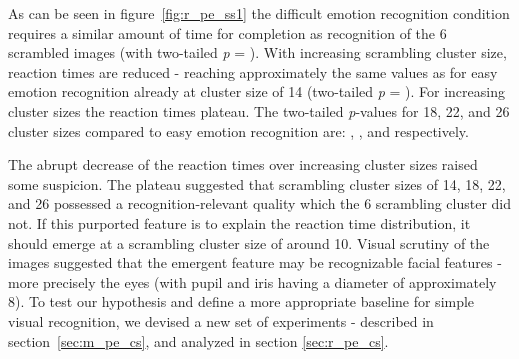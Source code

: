 	    As can be seen in figure~\ref{fig:r_pe_ss1} the difficult emotion recognition condition requires a similar amount of time for completion as recognition of the \SI{6}{\pixel} scrambled images 
	    (with two-tailed \textit{p} = ).
	    With increasing scrambling cluster size, reaction times are reduced - reaching approximately the same values as for easy emotion recognition already at cluster size of \SI{14}{\pixel}
	    (two-tailed \textit{p} = ).
	    For increasing cluster sizes the reaction times plateau. 
	    The two-tailed \textit{p}-values for \SI{18}{\pixel}, \SI{22}{\pixel}, and \SI{26}{\pixel} cluster sizes compared to easy emotion recognition are:
	    , , and  respectively.
	    
	    The abrupt decrease of the reaction times over increasing cluster sizes raised some suspicion.
	    The plateau suggested that scrambling cluster sizes of \SI{14}{\pixel}, \SI{18}{\pixel}, \SI{22}{\pixel}, and \SI{26}{\pixel} possessed a recognition-relevant quality which the \SI{6}{\pixel} scrambling cluster did not.
	    If this purported feature is to explain the reaction time distribution, it should emerge at a scrambling cluster size of around \SI{10}{\pixel}.
	    Visual scrutiny of the images suggested that the emergent feature may be recognizable facial features - more precisely the eyes (with pupil and iris having a diameter of approximately \SI{8}{\pixel}).
	    To test our hypothesis and define a more appropriate baseline for simple visual recognition, we devised a new set of experiments - described in section~\ref{sec:m_pe_cs}, and analyzed in section \ref{sec:r_pe_cs}.
	    

